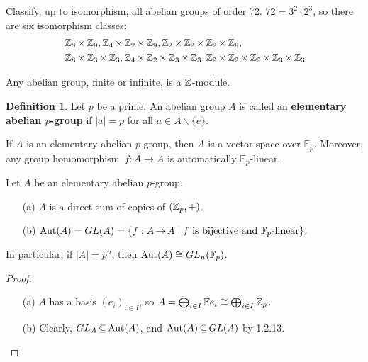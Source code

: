\documentclass[11pt]{book}
\theoremstyle{definition}   \newtheorem{defn}[counter]{Definition} %
\newcommand{\bs}{\backslash}   \newcommand{\A}{\mathcal{A}}   \newcommand{\sy}{\textnormal{Syl}}   \newcommand{\size}[1]{\left| #1 \right|}
\newcommand{\hm}{homomorphism}   \newcommand{\hms}{homomorphisms}   \newcommand{\iso}{isomorphism}
\DeclareMathOperator{\ra}{\rightarrow}   \DeclareMathOperator{\Poly}{\mathbf{P}}   \DeclareMathOperator{\spn}{\textnormal{span}}   \DeclareMathOperator{\aut}{\textnormal{Aut}}
\newcommand{\vs}{\vspace{8pt}}
\numberwithin{counter}{chapter}
\begin{document}
\begin{example*}
Classify, up to isomorphism, all abelian groups of order 72. $72 = 3^2 \cdot 2^3$, so there are six isomorphism classes:
	\begin{align*}
	&\operatorname{\mathbb{Z}}_8 \times \operatorname{\mathbb{Z}}_9, \operatorname{\mathbb{Z}}_4 \times \operatorname{\mathbb{Z}}_2 \times \operatorname{\mathbb{Z}}_9, \operatorname{\mathbb{Z}}_2 \times \operatorname{\mathbb{Z}}_2 \times \operatorname{\mathbb{Z}}_2 \times \operatorname{\mathbb{Z}}_9, \\
	&\operatorname{\mathbb{Z}}_8 \times \operatorname{\mathbb{Z}}_3 \times \operatorname{\mathbb{Z}}_3, \operatorname{\mathbb{Z}}_4 \times \operatorname{\mathbb{Z}}_2 \times \operatorname{\mathbb{Z}}_3 \times \operatorname{\mathbb{Z}}_3, \operatorname{\mathbb{Z}}_2 \times \operatorname{\mathbb{Z}}_2 \times \operatorname{\mathbb{Z}}_2 \times \operatorname{\mathbb{Z}}_3 \times \operatorname{\mathbb{Z}}_3
	\end{align*}
\end{example*}

\vs

\begin{remark}
Any abelian group, finite or infinite, is a $\operatorname{\mathbb{Z}}$-module.
\end{remark}

\vs

\begin{defn}
Let $p$ be a prime. An abelian group $A$ is called an \textbf{elementary abelian $p$-group} if $|a| = p$ for all $a \in A \bs \{e\}$.
\end{defn}

\vs

\begin{remark}
If $A$ is an elementary abelian $p$-group, then $A$ is a vector space over $\mathbb{F}_p$. Moreover, any group \hm\ $f : A \ra A$ is automatically $\mathbb{F}_p$-linear.
\end{remark}

\vs

\begin{corollary}
Let $A$ be an elementary abelian $p$-group.
	\begin{enumerate}
	\item[(a)] $A$ is a direct sum of copies of $(\operatorname{\mathbb{Z}}_p,+)$.
	\item[(b)] $\aut(A) = GL(A) = \{f : A \ra A \mid f \tn{ is bijective and $\mathbb{F}_p$-linear}\}$.
	\end{enumerate}
In particular, if $|A| = p^n$, then $\aut(A) \cong GL_n(\mathbb{F}_p)$.
\end{corollary}

\begin{proof}\
\begin{enumerate}
\item[(a)] $A$ has a basis $(e_i)_{i \in I}$, so $A = \bigoplus_{i\in I} \mathbb{F} e_i \cong \bigoplus_{i \in I} \operatorname{\mathbb{Z}}_p$.
\item[(b)] Clearly, $GL_A \sub \aut(A)$, and $\aut(A) \sub GL(A)$ by 1.2.13.
\end{enumerate}
\end{proof}
\end{document}
